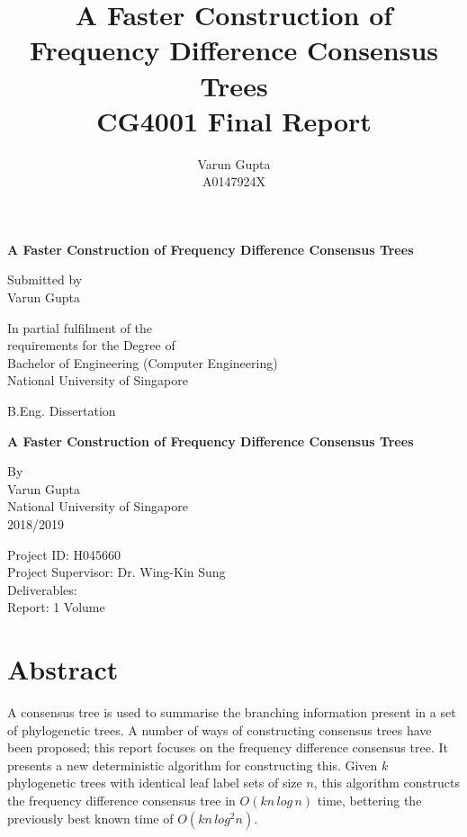 \documentclass[12pt,a4paper]{article}
\title{A Faster Construction of Frequency Difference Consensus Trees\\CG4001 Final Report}
\author{Varun Gupta\\A0147924X}
\begin{document}
    \begin{titlepage}
        \begin{center}
            \Large
            \textbf{A Faster Construction of Frequency Difference Consensus Trees}

            \vspace{7cm}

            Submitted by\\
            Varun Gupta

            \vfill

            In partial fulfilment of the\\
            requirements for the Degree of\\
            Bachelor of Engineering (Computer Engineering)\\
            National University of Singapore
        \end{center}
    \end{titlepage}
    \newpage

    \begin{titlepage}
        \begin{center}
            \large
            B.Eng. Dissertation
            \vspace{2cm}

            \Large
            \textbf{A Faster Construction of Frequency Difference Consensus Trees}

            \vspace{4cm}

            \large
            By\\
            Varun Gupta\\
            National University of Singapore\\
            2018/2019
        \end{center}

        \vfill

        \large
        Project ID: H045660\\
        Project Supervisor: Dr. Wing-Kin Sung\\

        Deliverables:\\
        \hspace*{1.5cm}Report: 1 Volume
    \end{titlepage}
    \newpage

    \section*{Abstract}
    A consensus tree is used to summarise the branching information present in a set of phylogenetic trees. A number of ways of constructing consensus trees have been proposed; this report focuses on the frequency difference consensus tree. It presents a new deterministic algorithm for constructing this. Given $k$ phylogenetic trees with identical leaf label sets of size $n$, this algorithm constructs the frequency difference consensus tree in $O(kn\,log\,n)$ time, bettering the previously best known time of $O(kn\,log^2n)$.
\end{document}
